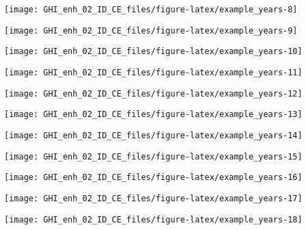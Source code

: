 \documentclass[
  10pt,
  a4paper,oneside]{article}
\begin{document}
\begin{center}\texttt{[image: GHI\_enh\_02\_ID\_CE\_files/figure-latex/example\_years-8]} \end{center}

\begin{center}\texttt{[image: GHI\_enh\_02\_ID\_CE\_files/figure-latex/example\_years-9]} \end{center}

\begin{center}\texttt{[image: GHI\_enh\_02\_ID\_CE\_files/figure-latex/example\_years-10]} \end{center}

\begin{center}\texttt{[image: GHI\_enh\_02\_ID\_CE\_files/figure-latex/example\_years-11]} \end{center}

\begin{center}\texttt{[image: GHI\_enh\_02\_ID\_CE\_files/figure-latex/example\_years-12]} \end{center}

\begin{center}\texttt{[image: GHI\_enh\_02\_ID\_CE\_files/figure-latex/example\_years-13]} \end{center}

\begin{center}\texttt{[image: GHI\_enh\_02\_ID\_CE\_files/figure-latex/example\_years-14]} \end{center}

\begin{center}\texttt{[image: GHI\_enh\_02\_ID\_CE\_files/figure-latex/example\_years-15]} \end{center}

\begin{center}\texttt{[image: GHI\_enh\_02\_ID\_CE\_files/figure-latex/example\_years-16]} \end{center}

\begin{center}\texttt{[image: GHI\_enh\_02\_ID\_CE\_files/figure-latex/example\_years-17]} \end{center}

\begin{center}\texttt{[image: GHI\_enh\_02\_ID\_CE\_files/figure-latex/example\_years-18]} \end{center}
\end{document}
